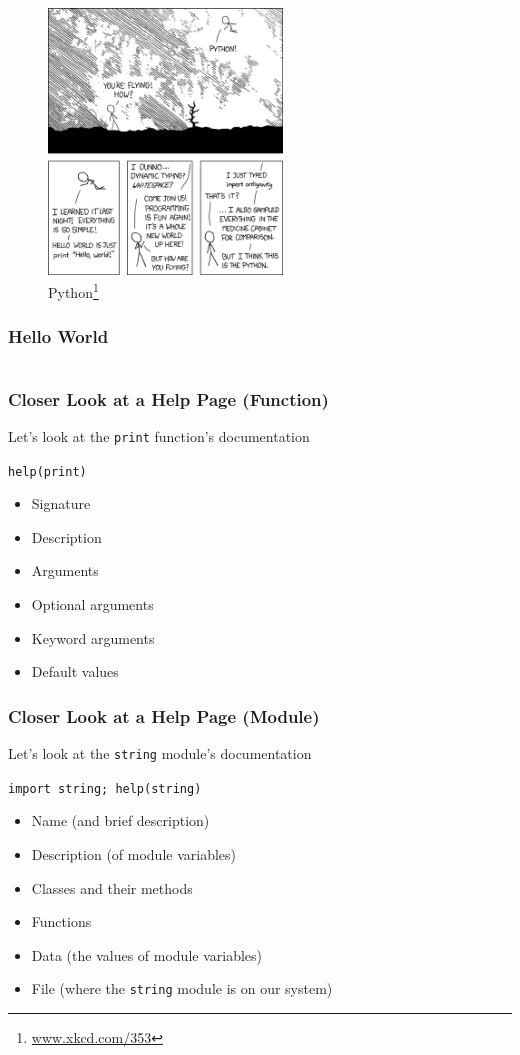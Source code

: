 \documentclass{beamer}
\begin{document}
\begin{frame}
\begin{figure}
  \begin{center}
    \includegraphics[height=200pt,keepaspectratio]{xkcd_python.png}
    \caption
    {
      Python\footnote{\url{www.xkcd.com/353}} 
    }
    \end{center}
  \end{figure}
\end{frame}


\begin{frame}
  \frametitle{Hello World}
  \inputminted{python}{hello.py}
\end{frame}


\begin{frame}
  \frametitle{Closer Look at a Help Page (Function)}
  Let's look at the \texttt{print} function's 
  documentation

  \lstinline{help(print)}

  \begin{itemize}
    \item Signature
    \item Description
    \item Arguments
    \item Optional arguments
    \item Keyword arguments
    \item Default values
  \end{itemize}

\end{frame}


\begin{frame}
  \frametitle{Closer Look at a Help Page (Module)}
  Let's look at the \texttt{string} module's 
  documentation

  \lstinline{import string; help(string)}

  \begin{itemize}
    \item Name (and brief description)
    \item Description (of module variables)
    \item Classes and their methods
    \item Functions
    \item Data (the values of module variables)
    \item File (where the \texttt{string} module is on our system)
   \end{itemize}

\end{frame}
\end{document}
